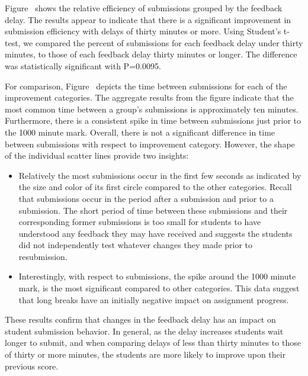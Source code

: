 Figure~ shows the relative efficiency of
submissions grouped by the feedback delay. The results appear to indicate that
there is a significant improvement in submission efficiency with delays of
thirty minutes or more. Using Student's t-test, we compared the percent of
\imp{} submissions for each feedback delay under thirty minutes, to those of
each feedback delay thirty minutes or longer. The difference was statistically
significant with P=0.0095.

For comparison, Figure~ depicts the time between
submissions for each of the improvement categories. The aggregate results from
the figure indicate that the most common time between a group's submissions is
approximately ten minutes. Furthermore, there is a consistent spike in time
between submissions just prior to the 1000 minute mark. Overall, there is not a
significant difference in time between submissions with respect to improvement
category. However, the shape of the individual scatter lines provide two
insights:

\begin{itemize}
\item Relatively the most \noii{} submissions occur in the first few seconds as
  indicated by the size and color of its first circle compared to the other
  categories. Recall that \noii{} submissions occur in the period after a
  \worse{} submission and prior to a \imp{} submission. The short period of
  time between these submissions and their corresponding former submissions is
  too small for students to have understood any feedback they may have received
  and suggests the students did not independently test whatever changes they
  made prior to resubmission.
\item Interestingly, with respect to \worse{} submissions, the spike around the
  1000 minute mark, is the most significant compared to other categories. This
  data suggest that long breaks have an initially negative impact on assignment
  progress.
\end{itemize}

These results confirm that changes in the feedback delay has an impact on
student submission behavior. In general, as the delay increases students wait
longer to submit, and when comparing delays of less than thirty minutes to
those of thirty or more minutes, the students are more likely to improve upon
their previous score.

